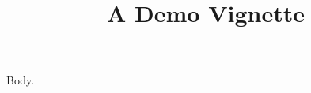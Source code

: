 \documentclass[article,nojss]{jss}
\title{A Demo Vignette}
\begin{document}
\maketitle
Body.
\end{document}
